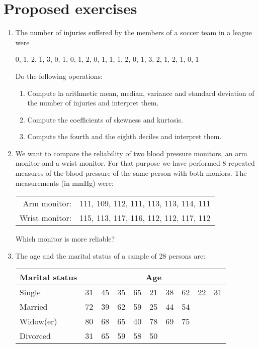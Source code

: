 \section{Proposed exercises}
\begin{enumerate}[leftmargin=*]
\item The number of injuries suffered by the members of a soccer team in a league were
\begin{center}
0, 1, 2, 1, 3, 0, 1, 0, 1, 2, 0, 1, 1, 1, 2, 0, 1, 3, 2, 1, 2, 1, 0, 1
\end{center}

Do the following operations:
\begin{enumerate}
\item Compute la arithmetic mean, median, variance and standard deviation of the number of injuries and interpret them.
\item Compute the coefficients of skewness and kurtosis.
\item Compute the fourth and the eighth deciles and interpret them.
\end{enumerate}

\item We want to compare the reliability of two blood pressure monitors, an arm monitor and a wrist monitor. 
For that purpose we have performed 8 repeated measures of the blood pressure of the same person with both moniors.
The measurements (in mmHg) were:
\begin{center}
\begin{tabular}{rl}
Arm monitor: & 111, 109, 112, 111, 113, 113, 114, 111\\
Wrist monitor: & 115, 113, 117, 116, 112, 112, 117, 112
\end{tabular}
\end{center}
Which monitor is more reliable?

\item The age and the marital status of a sample of 28 persons are:
\begin{center}
\begin{tabular}{|l|rrrrrrrrr|}
\hline
Marital status & \multicolumn{9}{c|}{Age}\\
\hline
Single    & 31 & 45 & 35 & 65 & 21 & 38 & 62 & 22 & 31 \\
Married     & 72 & 39 & 62 & 59 & 25 & 44 & 54 &    &    \\
Widow(er)      & 80 & 68 & 65 & 40 & 78 & 69 & 75 &    &    \\
Divorced & 31 & 65 & 59 & 58 & 50 &    &    &    &    \\
\hline
\end{tabular}
\end{center}


\end{enumerate}
